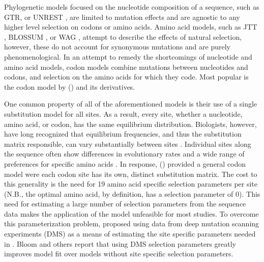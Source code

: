 \documentclass[fleqn,letterpaper]{article}
\begin{document}
Phylogenetic models focused on the nucleotide composition of a sequence, such as GTR, or UNREST \citep{Tavare1986,Yang1994}, are limited to mutation effects and are agnostic to any higher level selection on codons or amino acids.
Amino acid models, such as JTT \citep{jones1992}, BLOSSUM \citep{blossum}, or WAG \citep{whelan2001}, attempt to describe the effects of natural selection, however, these do not account for synonymous mutations and are purely phenomenological.
In an attempt to remedy the shortcomings of nucleotide and amino acid models, codon models combine mutations between nucleotides and codons, and selection on the amino acids for which they code.
Most popular is the codon model by \citet{GoldmanAndYang1994} (\gy) and its derivatives.

One common property of all of the aforementioned models is their use of a single substitution model for all sites. 
As a result, every site, whether a nucleotide,  amino acid, or codon, has the same equilibrium distribution.
Biologists, however, have long recognized that equilibrium frequencies, and thus the substitution matrix responsible, can vary substantially between sites \citep{felsenstein1981, gojobori1983}.
Individual sites along the sequence often show differences in evolutionary rates and a wide range of preferences for specific amino acids \citep{ashenberg2013, echave2016}.
In response, \citet{HalpernAndBruno1998} (\hb) provided a general codon model were each codon site has its own, distinct substitution matrix.
The cost to this generality is the need for 19 amino acid specific selection parameters per site (N.B., the optimal amino acid, by definition, has a selection parameter of 0).
This need for estimating a large number of selection parameters from the sequence data makes the application of the \hb model unfeasible for most studies.
To overcome this parameterization problem,\citet{bloom2014} proposed using data from deep mutation scanning experiments (DMS) as a means of estimating the site specific parameters needed in \hb.
Bloom and others \citep{bloom2014, bloom2017, hilton2017} report that using DMS selection parameters greatly improves model fit over models without site specific selection parameters.
\end{document}
